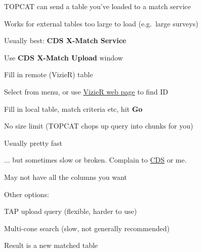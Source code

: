 \documentclass[20pt,landscape]{foils}
\newcommand{\bhref}[2]{\href{#1}{{\color{blue}#2}}}
\newcommand{\buttimg}[1]
           {\mbox{\vtop{\vskip-2ex\hbox{\texttt{[image: \#1]}}}}}
\begin{document}
\begin{list0}
  \item TOPCAT can send a table you've loaded to a match service
  \item Works for external tables too large to load (e.g.\ large surveys)
  \item Usually best: {\bf CDS X-Match Service}
  \begin{list2big}
    \item Use \buttimg{xm3.png} {\bf CDS X-Match Upload} window
    \item Fill in remote (VizieR) table
    \begin{list3}
      \item Select from menu, or use
            \bhref{https://vizier.cds.unistra.fr/}{VizieR web page}
            to find ID
    \end{list3}
    \item Fill in local table, match criteria etc, hit {\bf Go}
    \item No size limit (TOPCAT chops up query into chunks for you)
    \item Usually pretty fast
    \begin{list2big}
      \item[] ... but sometimes slow or broken.
              Complain to \bhref{mailto:cds-question@unistra.fr}{CDS} or me.
    \end{list2big}
    \item May not have all the columns you want
  \end{list2big}
  \item Other options:
  \begin{list2big}
    \item TAP upload query (flexible, harder to use)
    \item Multi-cone search (slow, not generally recommended)
  \end{list2big}
  \item Result is a new matched table
\end{list0}

\end{document}
